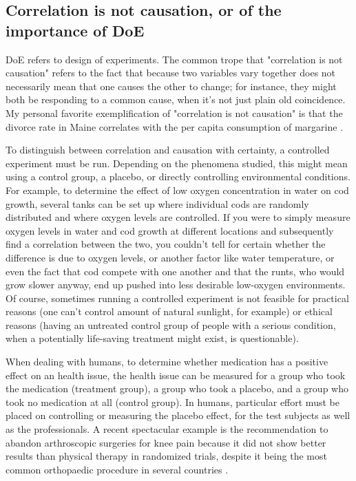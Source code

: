 \documentclass{report}
\begin{document}
		\subsection{Correlation is not causation, or of the importance of DoE}
		DoE refers to design of experiments. The common trope that "correlation is not causation" refers to the fact that because two variables vary together does not necessarily mean that one causes the other to change; for instance, they might both be responding to a common cause, when it's not just plain old coincidence. My personal favorite exemplification of "correlation is not causation" is that the divorce rate in Maine correlates with the per capita consumption of margarine \cite{vigen}.
	
		To distinguish between correlation and causation with certainty, a controlled experiment must be run. Depending on the phenomena studied, this might mean using a control group, a placebo, or directly controlling environmental conditions. For example, to determine the effect of low oxygen concentration in water on cod growth, several tanks can be set up where individual cods are randomly distributed and where oxygen levels are controlled. If you were to simply measure oxygen levels in water and cod growth at different locations and subsequently find a correlation between the two, you couldn't tell for certain whether the difference is due to oxygen levels, or another factor like water temperature, or even the fact that cod compete with one another and that the runts, who would grow slower anyway, end up pushed into less desirable low-oxygen environments. Of course, sometimes running a controlled experiment is not feasible for practical reasons (one can't control amount of natural sunlight, for example) or ethical reasons (having an untreated control group of people with a serious condition, when a potentially life-saving treatment might exist, is questionable).
	
		When dealing with humans, to determine whether medication has a positive effect on an health issue, the health issue can be measured for a group who took the medication (treatment group), a group who took a placebo, and a group who took no medication at all (control group). In humans, particular effort must be placed on controlling or measuring the placebo effect, for the test subjects as well as the professionals. A recent spectacular example is the recommendation to abandon arthroscopic surgeries for knee pain because it did not show better results than physical therapy in randomized trials, despite it being the most common orthopaedic procedure in several countries \cite{knee}.
	
\end{document}
